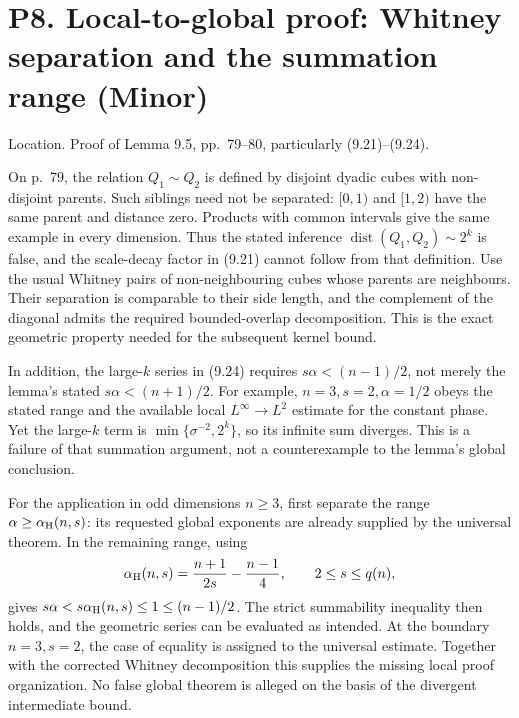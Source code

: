 \documentclass[10pt]{article}
\begin{document}
\section*{P8. Local-to-global proof: Whitney separation and the summation range (Minor)}
Location. Proof of Lemma 9.5, pp. 79–80, particularly (9.21)–(9.24).\par
On p. 79, the relation \(Q_1\sim Q_2\) is defined by disjoint dyadic cubes with non-disjoint parents. Such siblings need not be separated: \([0,1)\) and \([1,2)\) have the same parent and distance zero. Products with common intervals give the same example in every dimension. Thus the stated inference \(\operatorname{dist}(Q_1,Q_2)\sim2^k\) is false, and the scale-decay factor in (9.21) cannot follow from that definition. Use the usual Whitney pairs of non-neighbouring cubes whose parents are neighbours. Their separation is comparable to their side length, and the complement of the diagonal admits the required bounded-overlap decomposition. This is the exact geometric property needed for the subsequent kernel bound.\par
In addition, the large-\(k\) series in (9.24) requires \(s\alpha<(n-1)/2\), not merely the lemma’s stated \(s\alpha<(n+1)/2\). For example, \(n=3,s=2,\alpha=1/2\) obeys the stated range and the available local \(L^\infty\to L^2\) estimate for the constant phase. Yet the large-\(k\) term is \(\min\{\sigma^{-2},2^k\}\), so its infinite sum diverges. This is a failure of that summation argument, not a counterexample to the lemma’s global conclusion.\par
For the application in odd dimensions \(n\geq3\), first separate the range \(\alpha\geq\alpha_{\rm H}(n,s)\): its requested global exponents are already supplied by the universal theorem. In the remaining range, using \[\alpha_{\rm H}(n,s)=\frac{n+1}{2s}-\frac{n-1}{4},
 \qquad 2\leq s\leq q(n),\] gives \(s\alpha<s\alpha_{\rm H}(n,s)\leq1\leq(n-1)/2\). The strict summability inequality then holds, and the geometric series can be evaluated as intended. At the boundary \(n=3,s=2\), the case of equality is assigned to the universal estimate. Together with the corrected Whitney decomposition this supplies the missing local proof organization. No false global theorem is alleged on the basis of the divergent intermediate bound.\par
\end{document}
